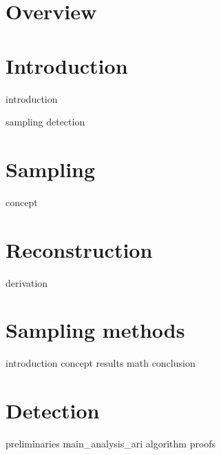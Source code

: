 \documentclass[a4paper, openany, oneside]{memoir}
\begin{document}
\chapter{Overview}

\chapter{Introduction}
{introduction}

{sampling}
{detection}


\chapter{Sampling}

{concept}

\chapter{Reconstruction}

{derivation}

\chapter{Sampling methods}

{introduction}
{concept}
{results}
{math} 
{conclusion}


\chapter{Detection}

{preliminaries}
{main_analysis_ari}
{algorithm}
{proofs}
\end{document}
